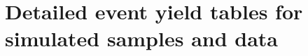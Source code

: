\chapter{Detailed event yield tables for simulated samples and data}
\label{app:cutflow}


\renewcommand{\arraystretch}{1.1}
\begin{table}[!h]
\centering
\caption{Event yields after each selection step for various background processes. FIXME update this table with correct ttjets sample!!}
\label{tab:CutflowMC}
\end{table}
